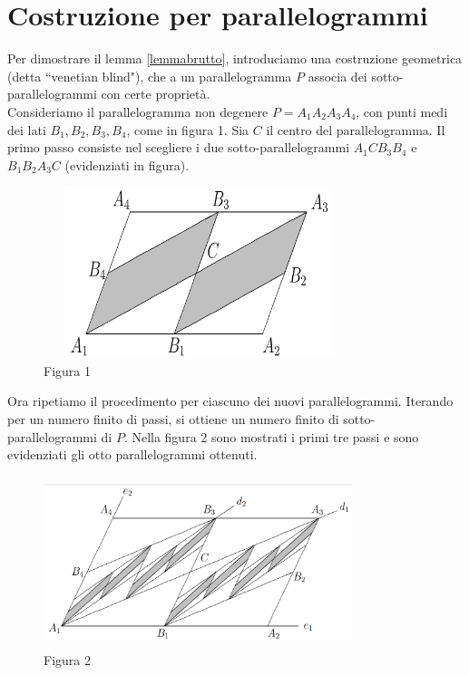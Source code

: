 \documentclass[a4paper, twoside]{article}
\newcommand{\<}{\langle}
\renewcommand{\>}{\rangle}
\begin{document}
\newpage

\section{Costruzione per parallelogrammi}

Per dimostrare il lemma \ref{lemmabrutto}, introduciamo una costruzione geometrica (detta ``venetian blind"), che a un parallelogramma $P$ associa dei sotto-parallelogrammi con certe proprietà.\\
Consideriamo il parallelogramma non degenere $P=A_{1} A_{2} A_{3} A_{4}$, con punti medi dei lati $B_{1}, B_{2}, B_{3}, B_{4}$, come in figura 1. Sia $C$ il centro del parallelogramma. Il primo passo consiste nel scegliere i due sotto-parallelogrammi $A_{1} C B_{3} B_{4}$ e $B_{1} B_{2} A_{3} C$ (evidenziati in figura).


	\begin{figure} [h!]
	\includegraphics[width=9cm, height=5cm]{passo1grigio.png}
	\centering
	\caption{Figura 1}
	\end{figure}


Ora ripetiamo il procedimento per ciascuno dei nuovi parallelogrammi. Iterando per un numero finito di passi, si ottiene un numero finito di sotto-parallelogrammi di $P$. Nella figura 2 sono mostrati i primi tre passi e sono evidenziati gli otto parallelogrammi ottenuti.\\

\begin{figure} [h!]
	\includegraphics[width=9cm, height=5cm]{passi123grigio.png}
	\centering
	\caption{Figura 2}
\end{figure}
\end{document}
